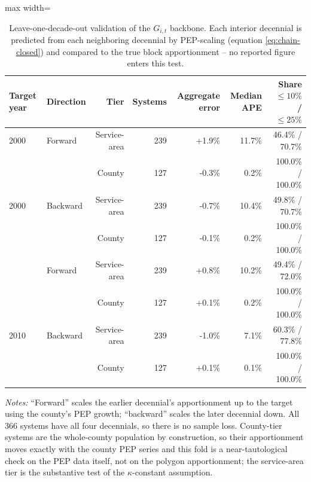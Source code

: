 \begin{table}[ht]
\centering
\caption{Leave-one-decade-out validation of the $G_{i,t}$ backbone. Each interior decennial is predicted from each neighboring decennial by PEP-scaling (equation \ref{eq:chain-closed}) and compared to the true block apportionment -- no reported figure enters this test.}
\label{tab:backcast_lodo}
\begin{adjustbox}{max width=\textwidth}
\begin{tabular}{llrrrrr}
\toprule
Target year & Direction & Tier & Systems & Aggregate error & Median APE & Share $\le\!10\%$ / $\le\!25\%$ \\
\midrule
2000 & Forward & Service-area & 239 & +1.9\% & 11.7\% & 46.4\% / 70.7\% \\
 &  & County & 127 & -0.3\% & 0.2\% & 100.0\% / 100.0\% \\
2000 & Backward & Service-area & 239 & -0.7\% & 10.4\% & 49.8\% / 70.7\% \\
 &  & County & 127 & -0.1\% & 0.2\% & 100.0\% / 100.0\% \\
\addlinespace
2010 & Forward & Service-area & 239 & +0.8\% & 10.2\% & 49.4\% / 72.0\% \\
 &  & County & 127 & +0.1\% & 0.2\% & 100.0\% / 100.0\% \\
2010 & Backward & Service-area & 239 & -1.0\% & 7.1\% & 60.3\% / 77.8\% \\
 &  & County & 127 & +0.1\% & 0.1\% & 100.0\% / 100.0\% \\
\bottomrule
\end{tabular}
\end{adjustbox}
\begin{minipage}{\textwidth}\footnotesize
\vspace{0.5em}
\textit{Notes:} ``Forward'' scales the earlier decennial's apportionment up to the target using the county's PEP growth; ``backward'' scales the later decennial down. All 366 systems have all four decennials, so there is no sample loss. County-tier systems are the whole-county population by construction, so their apportionment moves exactly with the county PEP series and this fold is a near-tautological check on the PEP data itself, not on the polygon apportionment; the service-area tier is the substantive test of the $\kappa$-constant assumption.
\end{minipage}
\end{table}
